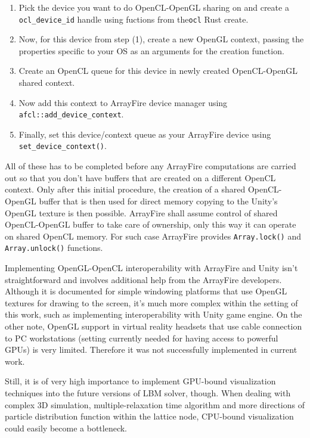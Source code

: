 \begin{enumerate}
	\item Pick the device you want to do OpenCL-OpenGL sharing on and create a \texttt{ocl_device_id} handle using fuctions from the\texttt{ocl} Rust create.
	\item Now, for this device from step (1), create a new OpenGL context, passing the properties specific to your OS as an arguments for the creation function.
	\item Create an OpenCL queue for this device in newly created OpenCL-OpenGL shared context.
	\item Now add this context to ArrayFire device manager using \texttt{afcl::add_device_context}.
	\item Finally, set this device/context queue as your ArrayFire device using \texttt{set_device_context()}.
\end{enumerate}

All of these has to be completed before any ArrayFire computations are carried out so that you don't have buffers that are created on a different OpenCL context. Only after this initial procedure, the creation of a shared OpenCL-OpenGL buffer that is then used for direct memory copying to the Unity's OpenGL texture is then possible. ArrayFire shall assume control of shared OpenCL-OpenGL buffer to take care of ownership, only this way it can operate on shared OpenCL memory. For such case ArrayFire provides 
\texttt{Array.lock()} and \texttt{Array.unlock()} functions.

Implementing OpenGL-OpenCL interoperability with ArrayFire and Unity isn't straightforward and involves additional help from the ArrayFire developers. Although it is documented for simple windowing platforms that use OpenGL textures for drawing to the screen, it's much more complex within the setting of this work, such as implementing interoperability with Unity game engine. On the other note, OpenGL support in virtual reality headsets that use cable connection to PC workstations (setting currently needed for having access to powerful GPUs) is very limited. Therefore it was not successfully implemented in current work. 

Still, it is of very high importance to implement GPU-bound visualization techniques into the future versions of LBM solver, though. When dealing with complex 3D simulation, multiple-relaxation time algorithm and more directions of particle distribution function within the lattice node, CPU-bound visualization could easily become a bottleneck.

